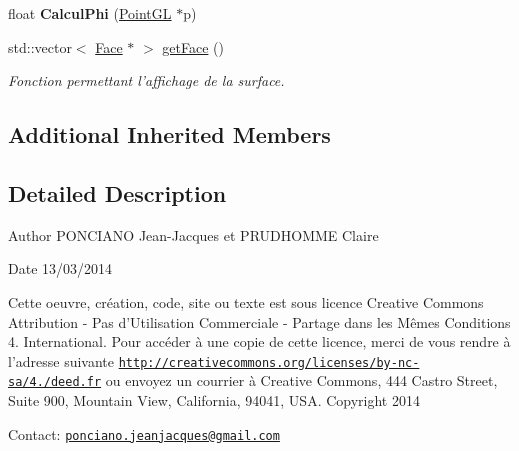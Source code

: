 \begin{DoxyCompactItemize}
\item 
\hypertarget{classSCirculaire_ab7a783cb6bb3e7f9abe1a131503b6292}{float {\bfseries Calcul\-Phi} (\hyperlink{classPointGL}{Point\-G\-L} $\ast$p)}\label{classSCirculaire_ab7a783cb6bb3e7f9abe1a131503b6292}

\item 
\hypertarget{classSCirculaire_a8adc636b41bb85c1340fa98f1c939f56}{std\-::vector$<$ \hyperlink{classFace}{Face} $\ast$ $>$ \hyperlink{classSCirculaire_a8adc636b41bb85c1340fa98f1c939f56}{get\-Face} ()}\label{classSCirculaire_a8adc636b41bb85c1340fa98f1c939f56}

\begin{DoxyCompactList}\small\item\em Fonction permettant l'affichage de la surface. \end{DoxyCompactList}\end{DoxyCompactItemize}
\subsection*{Additional Inherited Members}


\subsection{Detailed Description}
\begin{DoxyAuthor}{Author}
P\-O\-N\-C\-I\-A\-N\-O Jean-\/\-Jacques et P\-R\-U\-D\-H\-O\-M\-M\-E Claire 
\end{DoxyAuthor}
\begin{DoxyDate}{Date}
13/03/2014
\end{DoxyDate}
Cette oeuvre, création, code, site ou texte est sous licence Creative Commons Attribution -\/ Pas d’\-Utilisation Commerciale -\/ Partage dans les Mêmes Conditions 4. International. Pour accéder à une copie de cette licence, merci de vous rendre à l'adresse suivante \href{http://creativecommons.org/licenses/by-nc-sa/4.0/deed.fr}{\tt http\-://creativecommons.\-org/licenses/by-\/nc-\/sa/4./deed.\-fr} ou envoyez un courrier à Creative Commons, 444 Castro Street, Suite 900, Mountain View, California, 94041, U\-S\-A. Copyright 2014

Contact\-: \href{mailto:ponciano.jeanjacques@gmail.com}{\tt ponciano.\-jeanjacques@gmail.\-com} 


